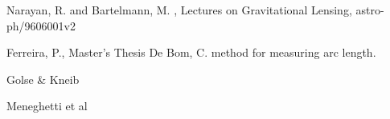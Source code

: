 
\begin{thebibliography}{99}

 Narayan, R. and Bartelmann, M. , Lectures on Gravitational Lensing, astro-ph/9606001v2

 Ferreira, P., Master's Thesis
 De Bom, C. method for measuring arc length.

 Golse \& Kneib

 Meneghetti et al


\end{thebibliography}


